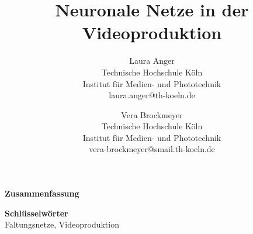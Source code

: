 \documentclass[times, 12pt,twocolumn]{article}
\begin{document}
\title{Neuronale Netze in der Videoproduktion}

\author{Laura Anger\\
Technische Hochschule K\"oln \\ Institut f\"ur Medien- und Phototechnik \\  laura.anger@th-koeln.de \\
\and
Vera Brockmeyer\\
Technische Hochschule K\"oln \\ Institut f\"ur Medien- und Phototechnik \\ vera-brockmeyer@smail.th-koeln.de \\
}

\maketitle
\thispagestyle{empty}

\large{\textbf{Zusammenfassung}}\\ \normalsize


\large{\textbf{Schl\"usselw\"orter}}\\ \normalsize
 Faltungsnetze, Videoproduktion


 \label{sec:Einleitung}

 \label{sec:Grundlagen}
 \label{sec:Videoproduktion}
 \label{sec:Faltungsnetze}

 \label{sec:Vorverarbeitung}
 \label{sec:SOTAVorverarbeitung}

 \label{sec:Produktion}
 \label{sec:SOTAProduktion}

 \label{sec:Postroduktion}
 \label{sec:SOTAPostproduktion}

 \label{Zusammenfassung}





 

\end{document}
